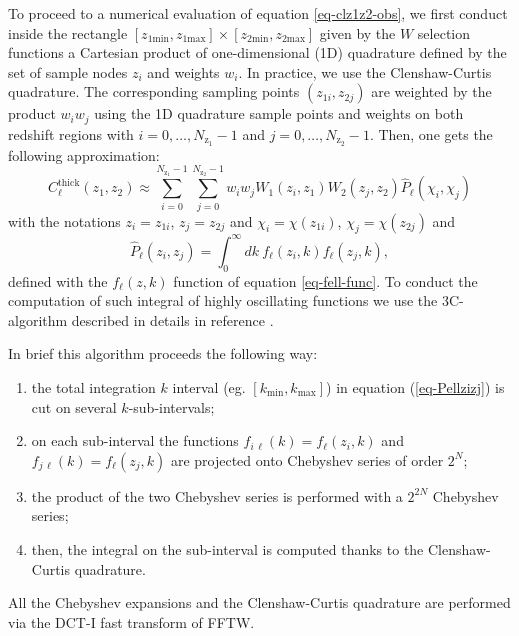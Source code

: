 \documentclass[\docopts]{\docclass}
\newcommand{\mrm}[1]{\mathrm{#1}}
\begin{document}
To proceed to a numerical evaluation of equation \ref{eq-clz1z2-obs}, we first conduct  inside the rectangle $ [z_{1\mrm{min}},z_{1\mrm{max}}] \times [z_{2\mrm{min}},z_{2\mrm{max}}]$ given by the $W$ selection functions a Cartesian product of one-dimensional (1D) quadrature 
 defined by the set of sample nodes $z_i$ and weights $w_i$. In practice, we use the Clenshaw-Curtis quadrature.   The corresponding sampling points $(z_{1i},z_{2j})$ are weighted by the product  $w_i w_j$ using the 1D quadrature sample points and weights on both redshift regions with $i=0,\dots, N_{\mrm{z}_1}-1$ and $j=0,\dots,N_{\mrm{z}_2}-1$. Then, one gets the following approximation:
\begin{equation}
C^{\mrm{thick}}_{\ell}(z_1, z_2) \approx  \sum_{i=0}^{N_{\mrm{z}_1}-1}\sum_{j=0}^{N_{\mrm{z}_2}-1} w_i w_j W_1(z_i,z_1)W_2(z_j,z_2) \widehat{P}_\ell(\chi_i,\chi_j)
\label{eq-cross-zquadra}
\end{equation}
with the notations $z_i = z_{1i}$, $z_j = z_{2j}$ and  $\chi_i = \chi(z_{1i})$, $\chi_j = \chi(z_{2j})$ and
\begin{equation}
\widehat{P}_\ell(z_i,z_j) =   \int_0^\infty dk\ f_\ell(z_i,k) f_\ell(z_j,k)
\label{eq-Pellzizj}
,\end{equation}
defined with the $f_\ell(z,k)$ function of equation \ref{eq-fell-func}. 
To conduct the computation of such integral of highly oscillating functions we use the 3C-algorithm described in details in reference \citep{2017arXiv170103592C}.

In brief this algorithm proceeds the following way:
\begin{enumerate}
\item the total integration $k$ interval (eg. $[k_\mathrm{min}, k_\mathrm{max}]$) in equation (\ref{eq-Pellzizj}) is cut on several $k$-sub-intervals;
\item  on each sub-interval the functions $f_{i\, \ell}(k) = f_\ell(z_i,k) $ and $f_{j\, \ell}(k) = f_\ell(z_j,k)$ are projected onto Chebyshev series of order $2^N$;
\item the product of the two Chebyshev series is performed with a $2^{2N}$ Chebyshev series; 
\item then, the integral on the sub-interval is computed thanks to the Clenshaw-Curtis quadrature.   
\end{enumerate}
All the Chebyshev expansions and the Clenshaw-Curtis quadrature are
performed via the DCT-I fast transform of FFTW. 
\end{document}
